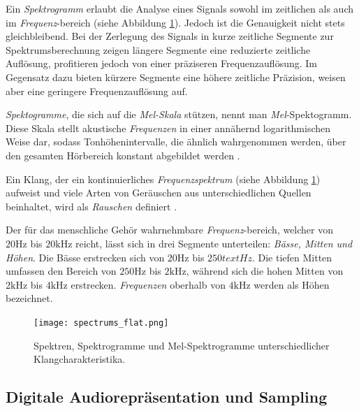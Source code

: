 \documentclass[
  a4paper,  %
  twoside,  %
  bibliography=totoc,
  headsepline,
  cleardoublepage=empty,
  parskip=half,
  draft=false
]{scrbook}
\begin{document}
Ein \emph{Spektrogramm} erlaubt die Analyse eines Signals sowohl im zeitlichen als auch im \emph{Frequenz}-bereich (siehe Abbildung \ref{fig:spectro}). Jedoch ist die Genauigkeit nicht stets gleichbleibend. Bei der Zerlegung des Signals in kurze zeitliche Segmente zur Spektrumsberechnung zeigen längere Segmente eine reduzierte zeitliche Auflösung, profitieren jedoch von einer präziseren Frequenzauflösung. Im Gegensatz dazu bieten kürzere Segmente eine höhere zeitliche Präzision, weisen aber eine geringere Frequenzauflösung auf. \cite{raffaseder_audiodesign_2010}

\emph{Spektogramme}, die sich auf die \emph{Mel-Skala} stützen, nennt man \emph{Mel}-Spektogramm. Diese Skala stellt akustische \emph{Frequenzen} in einer annähernd logarithmischen Weise dar, sodass Tonhöhenintervalle, die ähnlich wahrgenommen werden, über den gesamten Hörbereich konstant abgebildet werden \cite{noauthor_librosamel_frequencies_nodate}.

Ein Klang, der ein kontinuierliches \emph{Frequenzspektrum} (siehe Abbildung \ref{fig:spectro}) aufweist und viele Arten von Geräuschen aus unterschiedlichen Quellen beinhaltet, wird als \emph{Rauschen} definiert \cite{tsuji_physics_2021}.

Der für das menschliche Gehör wahrnehmbare \emph{Frequenz}-bereich, welcher von $20\text{Hz}$ bis $20\text{kHz}$ reicht, lässt sich in drei Segmente unterteilen: \emph{Bässe, Mitten und Höhen}. Die Bässe erstrecken sich von $20\text{Hz}$ bis $250text{Hz}$. Die tiefen Mitten umfassen den Bereich von $250\text{Hz}$ bis $2\text{kHz}$, während sich die hohen Mitten von $2\text{kHz}$ bis $4\text{kHz}$ erstrecken. \emph{Frequenzen} oberhalb von $4\text{kHz}$ werden als Höhen bezeichnet. \cite{raffaseder_audiodesign_2010}

\begin{figure}
  \centering
  \texttt{[image: spectrums\_flat.png]}
  \caption[Spektren, Spektrogramme und Mel-Spektrogramme]{Spektren, Spektrogramme und Mel-Spektrogramme unterschiedlicher Klangcharakteristika.}
  \label{fig:spectro}
\end{figure}


\subsection{Digitale Audiorepräsentation und Sampling}
\end{document}
